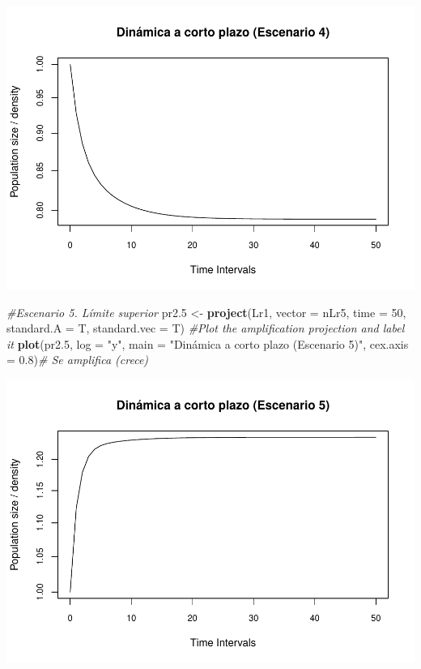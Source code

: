 \documentclass[
]{book}
\newenvironment{Shaded}{\begin{snugshade}}{\end{snugshade}}
\newcommand{\AttributeTok}[1]{\textcolor[rgb]{0.13,0.29,0.53}{#1}}
\newcommand{\CommentTok}[1]{\textcolor[rgb]{0.56,0.35,0.01}{\textit{#1}}}
\newcommand{\DecValTok}[1]{\textcolor[rgb]{0.00,0.00,0.81}{#1}}
\newcommand{\FloatTok}[1]{\textcolor[rgb]{0.00,0.00,0.81}{#1}}
\newcommand{\FunctionTok}[1]{\textcolor[rgb]{0.13,0.29,0.53}{\textbf{#1}}}
\newcommand{\NormalTok}[1]{#1}
\newcommand{\OtherTok}[1]{\textcolor[rgb]{0.56,0.35,0.01}{#1}}
\newcommand{\StringTok}[1]{\textcolor[rgb]{0.31,0.60,0.02}{#1}}
\theoremstyle{definition}
\theoremstyle{definition}
\theoremstyle{definition}
\theoremstyle{definition}
\theoremstyle{remark}
\begin{document}
\includegraphics{Diagnostico_Poblacional_files/figure-latex/chap10_5-4.pdf}

\begin{Shaded}
\begin{Highlighting}[]
\CommentTok{\#Escenario 5. Límite superior}
\NormalTok{pr2}\FloatTok{.5} \OtherTok{\textless{}{-}} \FunctionTok{project}\NormalTok{(Lr1, }\AttributeTok{vector =}\NormalTok{ nLr5, }\AttributeTok{time =} \DecValTok{50}\NormalTok{, }
                 \AttributeTok{standard.A =}\NormalTok{ T, }\AttributeTok{standard.vec =}\NormalTok{ T)}
\CommentTok{\#Plot the amplification projection and label it}
\FunctionTok{plot}\NormalTok{(pr2}\FloatTok{.5}\NormalTok{, }\AttributeTok{log =} \StringTok{"y"}\NormalTok{, }\AttributeTok{main =} \StringTok{"Dinámica a corto plazo (Escenario 5)"}\NormalTok{, }\AttributeTok{cex.axis =} \FloatTok{0.8}\NormalTok{)}\CommentTok{\# Se amplifica (crece)}
\end{Highlighting}
\end{Shaded}

\includegraphics{Diagnostico_Poblacional_files/figure-latex/chap10_5-5.pdf}
\end{document}
